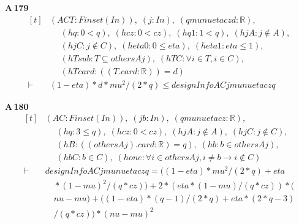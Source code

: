 \noindent\textbf{A\,179}\quad{}
{\footnotesize\[ \begin{aligned}[t]
&(\mathit{A} \mathit{C} \mathit{T} : \mathit{Finset} (\mathit{I} \mathit{n})),\; (\mathit{j} : \mathit{I} \mathit{n}),\; (\mathit{q} \mathit{mu} \mathit{nu} \mathit{eta} \mathit{cz} \mathit{d} : \mathbb{R} ),\\
&\quad \; (\mathit{hq} : 0 < \mathit{q}),\; (\mathit{hcz} : 0 < \mathit{cz}),\; (\mathit{hq1} : 1 < \mathit{q}),\; (\mathit{hjA} : \mathit{j} \notin \mathit{A}),\\
&\quad \; (\mathit{hjC} : \mathit{j} \notin \mathit{C}),\; (\mathit{heta0} : 0 \leq \mathit{eta}),\; (\mathit{heta1} : \mathit{eta} \leq 1),\\
&\quad \; (\mathit{hTsub} : \mathit{T} \subseteq \mathit{others} \mathit{A} \mathit{j}),\; (\mathit{hTC} : \forall \mathit{i} \in \mathit{T}, \mathit{i} \in \mathit{C}),\\
&\quad \; (\mathit{hTcard} : ((\mathit{T}.\mathit{card} : \mathbb{R} )) = \mathit{d})\\
\vdash\;&(1-\mathit{eta})*\mathit{d}*\mathit{mu}^{2}/(2*\mathit{q}) \leq \mathit{designInfo} \mathit{A} \mathit{C} \mathit{j} \mathit{mu} \mathit{nu} \mathit{eta} \mathit{cz} \mathit{q}
\end{aligned} \]}

\noindent\textbf{A\,180}\quad{}
{\footnotesize\[ \begin{aligned}[t]
&(\mathit{A} \mathit{C} : \mathit{Finset} (\mathit{I} \mathit{n})),\; (\mathit{j} \mathit{b} : \mathit{I} \mathit{n}),\; (\mathit{q} \mathit{mu} \mathit{nu} \mathit{eta} \mathit{cz} : \mathbb{R} ),\\
&\quad \; (\mathit{hq} : 3 \leq \mathit{q}),\; (\mathit{hcz} : 0 < \mathit{cz}),\; (\mathit{hjA} : \mathit{j} \notin \mathit{A}),\; (\mathit{hjC} : \mathit{j} \notin \mathit{C}),\\
&\quad \; (\mathit{hB} : ((\mathit{others} \mathit{A} \mathit{j}).\mathit{card} : \mathbb{R} ) = \mathit{q}),\; (\mathit{hb} : \mathit{b} \in \mathit{others} \mathit{A} \mathit{j}),\\
&\quad \; (\mathit{hbC} : \mathit{b} \in \mathit{C}),\; (\mathit{hone} : \forall \mathit{i} \in \mathit{others} \mathit{A} \mathit{j}, \mathit{i} \neq \mathit{b} \to \mathit{i} \notin \mathit{C})\\
\vdash\;&\mathit{designInfo} \mathit{A} \mathit{C} \mathit{j} \mathit{mu} \mathit{nu} \mathit{eta} \mathit{cz} \mathit{q} = ((1-\mathit{eta})*\mathit{mu}^{2}/(2*\mathit{q})+\mathit{eta}\\
&\quad *(1-\mathit{mu})^{2}/(\mathit{q}*\mathit{cz})) + 2*(\mathit{eta}*(1-\mathit{mu})/(\mathit{q}*\mathit{cz}))*(\\
&\quad \mathit{nu}-\mathit{mu}) + ((1-\mathit{eta})*(\mathit{q}-1)/(2*\mathit{q})+\mathit{eta}*(2*\mathit{q}-3)\\
&\quad /(\mathit{q}*\mathit{cz}))*(\mathit{nu}-\mathit{mu})^{2}
\end{aligned} \]}


